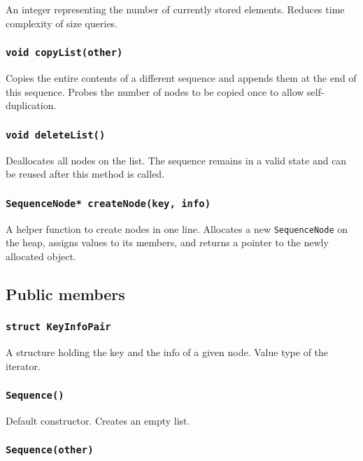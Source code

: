 ﻿\documentclass{article}
\begin{document}
An integer representing the number of currently stored elements. Reduces time
complexity of size queries.

\subsubsection{{\tt void copyList(other)}}

Copies the entire contents of a different sequence and appends them at the end
of this sequence. Probes the number of nodes to be copied once to allow
self-duplication.

\subsubsection{{\tt void deleteList()}}

Deallocates all nodes on the list. The sequence remains in a valid state and can
be reused after this method is called.

\subsubsection{{\tt SequenceNode* createNode(key, info)}}

A helper function to create nodes in one line. Allocates a new
{\tt SequenceNode} on the heap, assigns values to its members, and returns a
pointer to the newly allocated object.

\subsection{Public members}

\subsubsection{{\tt struct KeyInfoPair}}

A structure holding the key and the info of a given node. Value type of the
iterator.

\subsubsection{{\tt Sequence()}}

Default constructor. Creates an empty list.

\subsubsection{{\tt Sequence(other)}}
\end{document}
